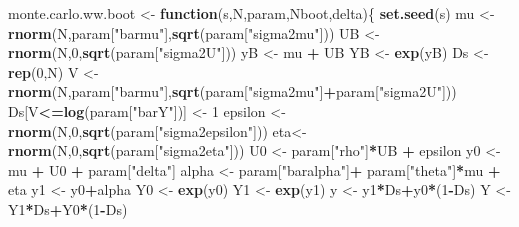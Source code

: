 \documentclass[]{book}
\newenvironment{Shaded}{\begin{snugshade}}{\end{snugshade}}
\newcommand{\KeywordTok}[1]{\textcolor[rgb]{0.13,0.29,0.53}{\textbf{#1}}}
\newcommand{\DecValTok}[1]{\textcolor[rgb]{0.00,0.00,0.81}{#1}}
\newcommand{\StringTok}[1]{\textcolor[rgb]{0.31,0.60,0.02}{#1}}
\newcommand{\ControlFlowTok}[1]{\textcolor[rgb]{0.13,0.29,0.53}{\textbf{#1}}}
\newcommand{\OperatorTok}[1]{\textcolor[rgb]{0.81,0.36,0.00}{\textbf{#1}}}
\newcommand{\NormalTok}[1]{#1}
\theoremstyle{definition}
\theoremstyle{definition}
\theoremstyle{definition}
\theoremstyle{remark}
\begin{document}
\begin{Shaded}
\begin{Highlighting}[]
\NormalTok{monte.carlo.ww.boot <-}\StringTok{ }\ControlFlowTok{function}\NormalTok{(s,N,param,Nboot,delta)\{}
  \KeywordTok{set.seed}\NormalTok{(s)}
\NormalTok{  mu <-}\StringTok{ }\KeywordTok{rnorm}\NormalTok{(N,param[}\StringTok{"barmu"}\NormalTok{],}\KeywordTok{sqrt}\NormalTok{(param[}\StringTok{"sigma2mu"}\NormalTok{]))}
\NormalTok{  UB <-}\StringTok{ }\KeywordTok{rnorm}\NormalTok{(N,}\DecValTok{0}\NormalTok{,}\KeywordTok{sqrt}\NormalTok{(param[}\StringTok{"sigma2U"}\NormalTok{]))}
\NormalTok{  yB <-}\StringTok{ }\NormalTok{mu }\OperatorTok{+}\StringTok{ }\NormalTok{UB }
\NormalTok{  YB <-}\StringTok{ }\KeywordTok{exp}\NormalTok{(yB)}
\NormalTok{  Ds <-}\StringTok{ }\KeywordTok{rep}\NormalTok{(}\DecValTok{0}\NormalTok{,N)}
\NormalTok{  V <-}\StringTok{ }\KeywordTok{rnorm}\NormalTok{(N,param[}\StringTok{"barmu"}\NormalTok{],}\KeywordTok{sqrt}\NormalTok{(param[}\StringTok{"sigma2mu"}\NormalTok{]}\OperatorTok{+}\NormalTok{param[}\StringTok{"sigma2U"}\NormalTok{]))}
\NormalTok{  Ds[V}\OperatorTok{<=}\KeywordTok{log}\NormalTok{(param[}\StringTok{"barY"}\NormalTok{])] <-}\StringTok{ }\DecValTok{1} 
\NormalTok{  epsilon <-}\StringTok{ }\KeywordTok{rnorm}\NormalTok{(N,}\DecValTok{0}\NormalTok{,}\KeywordTok{sqrt}\NormalTok{(param[}\StringTok{"sigma2epsilon"}\NormalTok{]))}
\NormalTok{  eta<-}\StringTok{ }\KeywordTok{rnorm}\NormalTok{(N,}\DecValTok{0}\NormalTok{,}\KeywordTok{sqrt}\NormalTok{(param[}\StringTok{"sigma2eta"}\NormalTok{]))}
\NormalTok{  U0 <-}\StringTok{ }\NormalTok{param[}\StringTok{"rho"}\NormalTok{]}\OperatorTok{*}\NormalTok{UB }\OperatorTok{+}\StringTok{ }\NormalTok{epsilon}
\NormalTok{  y0 <-}\StringTok{ }\NormalTok{mu }\OperatorTok{+}\StringTok{  }\NormalTok{U0 }\OperatorTok{+}\StringTok{ }\NormalTok{param[}\StringTok{"delta"}\NormalTok{]}
\NormalTok{  alpha <-}\StringTok{ }\NormalTok{param[}\StringTok{"baralpha"}\NormalTok{]}\OperatorTok{+}\StringTok{  }\NormalTok{param[}\StringTok{"theta"}\NormalTok{]}\OperatorTok{*}\NormalTok{mu }\OperatorTok{+}\StringTok{ }\NormalTok{eta}
\NormalTok{  y1 <-}\StringTok{ }\NormalTok{y0}\OperatorTok{+}\NormalTok{alpha}
\NormalTok{  Y0 <-}\StringTok{ }\KeywordTok{exp}\NormalTok{(y0)}
\NormalTok{  Y1 <-}\StringTok{ }\KeywordTok{exp}\NormalTok{(y1)}
\NormalTok{  y <-}\StringTok{ }\NormalTok{y1}\OperatorTok{*}\NormalTok{Ds}\OperatorTok{+}\NormalTok{y0}\OperatorTok{*}\NormalTok{(}\DecValTok{1}\OperatorTok{-}\NormalTok{Ds)}
\NormalTok{  Y <-}\StringTok{ }\NormalTok{Y1}\OperatorTok{*}\NormalTok{Ds}\OperatorTok{+}\NormalTok{Y0}\OperatorTok{*}\NormalTok{(}\DecValTok{1}\OperatorTok{-}\NormalTok{Ds)}

\end{Highlighting}
\end{Shaded}
\end{document}
